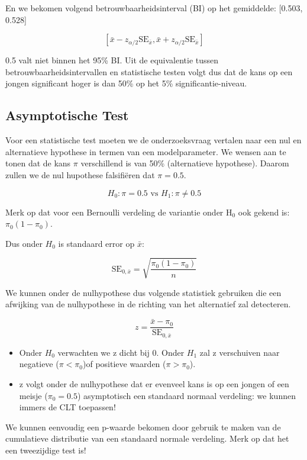 \documentclass[
  12pt,dutch,coursenotes]{book}
\begin{document}
En we bekomen volgend betrouwbaarheidsinterval (BI) op het gemiddelde: {[}0.503, 0.528{]}

\[ [\bar x - z_{\alpha/2} \text{SE}_{\bar x}, \bar x + z_{\alpha/2} \text{SE}_{\bar x}]\]

0.5 valt niet binnen het 95\% BI. Uit de equivalentie tussen betrouwbaarheidsintervallen en statistische testen volgt dus dat de kans op een jongen significant hoger is dan 50\% op het 5\% significantie-niveau.

\hypertarget{asymptotische-test}{%
\subsection{Asymptotische Test}\label{asymptotische-test}}

Voor een statistische test moeten we de onderzoeksvraag vertalen naar een nul en alternatieve hypothese in termen van een modelparameter.
We wensen aan te tonen dat de kans \(\pi\) verschillend is van 50\% (alternatieve hypothese).
Daarom zullen we de nul hupothese falsifiëren dat \(\pi = 0.5\).

\[H_0: \pi = 0.5 \text{ vs } H_1: \pi \neq 0.5\]

Merk op dat voor een Bernoulli verdeling de variantie onder H\(_0\) ook gekend is: \(\pi_0 (1-\pi_0)\).

Dus onder \(H_0\) is standaard error op \(\bar x\):

\[
\text{SE}_{0, \bar x}=\sqrt{\frac{\pi_0 (1-\pi_0)}{n}}
\]

We kunnen onder de nulhypothese dus volgende statistiek gebruiken die een afwijking van de nulhypothese in de richting van het alternatief zal detecteren.

\[ z = \frac{\bar x - \pi_0}{\text{SE}_{0, \bar x}}\]

\begin{itemize}
\item
  Onder \(H_0\) verwachten we z dicht bij 0. Onder \(H_1\) zal z verschuiven naar negatieve (\(\pi < \pi_0\))of positieve waarden (\(\pi>\pi_0\)).
\item
  z volgt onder de nulhypothese dat er evenveel kans is op een jongen of een meisje (\(\pi_0=0.5\)) asymptotisch een standaard normaal verdeling: we kunnen immers de CLT toepassen!
\end{itemize}

We kunnen eenvoudig een p-waarde bekomen door gebruik te maken van de cumulatieve distributie van een standaard normale verdeling. Merk op dat het een tweezijdige test is!
\end{document}
